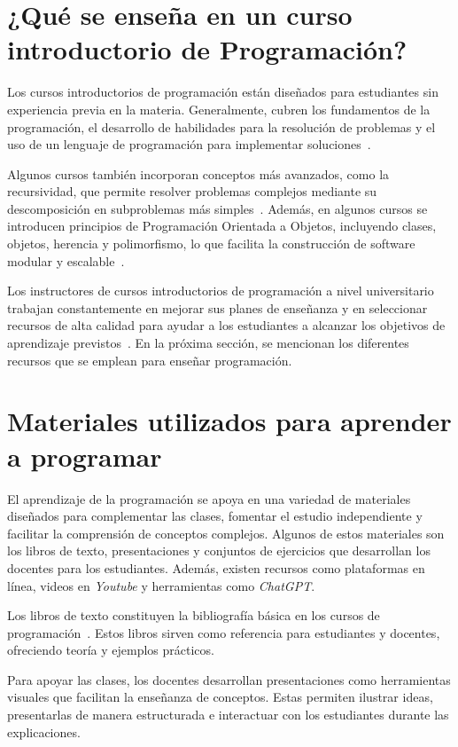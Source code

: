 \section{¿Qué se enseña en un curso introductorio de Programación?}\label{sec:contents}

Los cursos introductorios de programación están diseñados para estudiantes sin experiencia previa en la materia. Generalmente, cubren los fundamentos de la programación, el desarrollo de habilidades para la resolución de problemas y el uso de un lenguaje de programación para implementar soluciones~\cite{Medeiros2019}.

Algunos cursos también incorporan conceptos más avanzados, como la recursividad, que permite resolver problemas complejos mediante su descomposición en subproblemas más simples~\cite{cs50_harvard,mit_60001}. Además, en algunos cursos se introducen principios de Programación Orientada a Objetos, incluyendo clases, objetos, herencia y polimorfismo, lo que facilita la construcción de software modular y escalable~\cite{cs50_harvard, mit_60001}.

Los instructores de cursos introductorios de programación a nivel universitario trabajan constantemente en mejorar sus planes de enseñanza y en seleccionar recursos de alta calidad para ayudar a los estudiantes a alcanzar los objetivos de aprendizaje previstos~\cite{NAS2018}. En la próxima sección, se mencionan los diferentes recursos que se emplean para enseñar programación.

\section{Materiales utilizados para aprender a programar}\label{sec:resources}

El aprendizaje de la programación se apoya en una variedad de materiales diseñados para complementar las clases, fomentar el estudio independiente y facilitar la comprensión de conceptos complejos. Algunos de estos materiales son los libros de texto, presentaciones y conjuntos de ejercicios que desarrollan los docentes para los estudiantes. Además, existen recursos como plataformas en línea, videos en \textit{Youtube} y herramientas como \textit{ChatGPT}.

Los libros de texto constituyen la bibliografía básica en los cursos de programación~\cite{wong2022}. Estos libros sirven como referencia para estudiantes y docentes, ofreciendo teoría y ejemplos prácticos.

Para apoyar las clases, los docentes desarrollan presentaciones como herramientas visuales que facilitan la enseñanza de conceptos. Estas permiten ilustrar ideas, presentarlas de manera estructurada e interactuar con los estudiantes durante las explicaciones.


